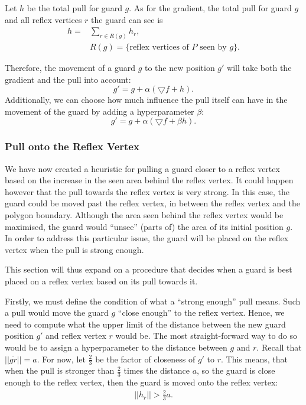Let $h$ be the total pull for guard $g$. As for the gradient, the total pull for guard $g$ and all reflex vertices $r$ the guard can see is 
\begin{align*}
    h = &\sum_{r \in R(g)} h_r, \\
    &R(g) = \{\text{reflex vertices of $P$ seen by $g$\}}.
\end{align*}

Therefore, the movement of a guard $g$ to the new position $g'$ will take both the gradient and the pull into account: $$g' = g + \alpha (\bigtriangledown f + h).$$ Additionally, we can choose how much influence the pull itself can have in the movement of the guard by adding a hyperparameter $\beta$: $$g' = g + \alpha (\bigtriangledown f + \beta h).$$

\subsubsection{Pull onto the Reflex Vertex}
\label{sec:pull_onto}
We have now created a heuristic for pulling a guard closer to a reflex vertex based on the increase in the seen area behind the reflex vertex. It could happen however that the pull towards the reflex vertex is very strong. In this case, the guard could be moved past the reflex vertex, in between the reflex vertex and the polygon boundary. Although the area seen behind the reflex vertex would be maximised, the guard would ``unsee'' (parts of) the area of its initial position $g$. In order to address this particular issue, the guard will be placed on the reflex vertex when the pull is strong enough. 

This section will thus expand on a procedure that decides when a guard is best placed on a reflex vertex based on its pull towards it.

Firstly, we must define the condition of what a ``strong enough'' pull means. Such a pull would move the guard $g$ ``close enough'' to the reflex vertex. Hence, we need to compute what the upper limit of the distance between the new guard position $g'$ and reflex vertex $r$ would be. The most straight-forward way to do so would be to assign a hyperparameter to the distance between $g$ and $r$. Recall that $||\overline{gr}|| = a$. For now, let $\frac 2 3$ be the factor of closeness of $g'$ to $r$. This means, that when the pull is stronger than $\frac 2 3$ times the distance $a$, so the guard is close enough to the reflex vertex, then the guard is moved onto the reflex vertex: 
\begin{align}
    ||h_r|| > \frac 2 3 a. \label{eq:h_a}
\end{align}


